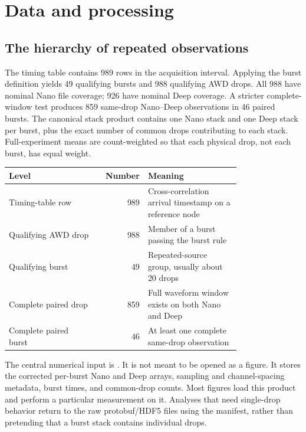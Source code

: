 \documentclass[11pt]{article}
\begin{document}
\section{Data and processing}

\subsection{The hierarchy of repeated observations}

The timing table contains 989 rows in the acquisition interval.  Applying the
burst definition yields 49 qualifying bursts and 988 qualifying AWD drops.
All 988 have nominal Nano file coverage; 926 have nominal Deep coverage.  A
stricter complete-window test produces 859 same-drop Nano--Deep observations in
46 paired bursts.  The canonical stack product contains one Nano stack and one
Deep stack per burst, plus the exact number of common drops contributing to
each stack.  Full-experiment means are count-weighted so that each physical drop,
not each burst, has equal weight.

\begin{center}
\begin{tabular}{p{0.38\linewidth}rp{0.40\linewidth}}
\toprule
Level & Number & Meaning \\
\midrule
Timing-table row & 989 & Cross-correlation arrival timestamp on a reference node \\
Qualifying AWD drop & 988 & Member of a burst passing the burst rule \\
Qualifying burst & 49 & Repeated-source group, usually about 20 drops \\
Complete paired drop & 859 & Full waveform window exists on both Nano and Deep \\
Complete paired burst & 46 & At least one complete same-drop observation \\
\bottomrule
\end{tabular}
\end{center}

The central numerical input is
.  It is not meant to be opened
as a figure.  It stores the corrected per-burst Nano and Deep arrays, sampling
and channel-spacing metadata, burst times, and common-drop counts.  Most figures
load this product and perform a particular measurement on it.  Analyses that
need single-drop behavior return to the raw protobuf/HDF5 files using the
manifest, rather than pretending that a burst stack contains individual drops.
\end{document}
